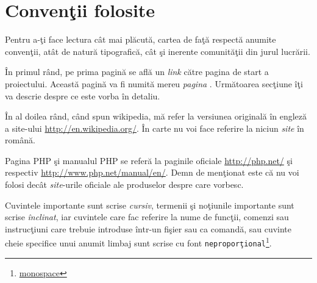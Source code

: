 
{}
\section*{Convenţii folosite}
Pentru a-ţi face lectura cât mai plăcută, cartea de faţă respectă anumite
convenţii, atât de natură tipografică, cât şi inerente comunităţii din jurul
lucrării.

În primul rând, pe prima pagină se află un \textsl{link} către pagina de
start a proiectului. Această pagină va fi numită mereu \textit{pagina \phpro}.
Următoarea secţiune îţi va descrie despre ce este vorba în detaliu.

În al doilea rând, când spun wikipedia, mă refer la versiunea originală
în engleză a site-ului \url{http://en.wikipedia.org/}. În carte nu voi face referire
la niciun \textsl{site} în română.


{\glqq}Pagina PHP{\grqq} şi {\glqq}manualul PHP{\grqq} se referă la paginile oficiale \url{http://php.net/}
şi respectiv \url{http://www.php.net/manual/en/}. Demn de menţionat este
că nu voi folosi decât \textit{site}-urile oficiale ale produselor despre
care vorbesc.


Cuvintele importante sunt scrise \textit{cursiv}, termenii şi noţiunile
importante sunt scrise \textsl{înclinat}, iar cuvintele care fac referire
la nume de funcţii, comenzi sau instrucţiuni care trebuie introduse
într-un fişier sau ca comandă,
sau cuvinte cheie specifice unui anumit limbaj
sunt scrise cu font \texttt{neproporţional}\footnote{\href{http://en.wikipedia.org/wiki/Monospaced_font}{monospace}}.


